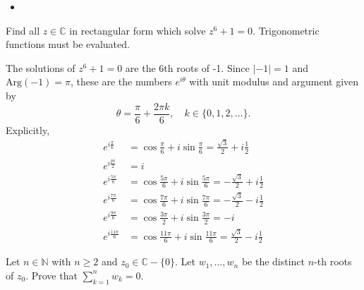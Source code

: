 \documentclass{article}
\newcounter{Problem}
\newenvironment{Problem}{\begin{Exercise}[name={Problem},
                                          counter={Problem}]}
                        {\end{Exercise}}
\begin{document}
\begin{Answer}
  \begin{itemize}
    \item{

    }
  \end{itemize}
\end{Answer}

\begin{Problem}
Find all $z \in \mathbb{C}$ in rectangular form which solve
$z^6 + 1 = 0$. Trigonometric functions must be evaluated.
\end{Problem}

\begin{Answer}
The solutions of $z^6 + 1 = 0$ are the 6th roots of -1. Since $|-1| =
1$ and $\mathrm{Arg}(-1) = \pi$, these are the numbers $e^{i\theta}$ with unit
modulus and argument given by
$$
  \theta
= \frac{\pi}{6} + \frac{2 \pi k}{6},
\quad k \in \{ 0, 1, 2, \dots \}.
$$
Explicitly,
\begin{align*}
   e^{i\frac{\pi}{6}}
&= \cos \frac{\pi}{6} + i \sin \frac{\pi}{6}
 = \frac{\sqrt{3}}{2} + i \frac{1}{2} \\
   e^{i\frac{pi}{2}}
&= i \\
   e^{i\frac{5 \pi}{6}}
&= \cos \frac{5\pi}{6} + i \sin \frac{5\pi}{6}
 = -\frac{\sqrt{3}}{2} + i \frac{1}{2} \\
   e^{i\frac{7\pi}{6}}
&= \cos \frac{7\pi}{6} + i \sin \frac{7\pi}{6}
 = -\frac{\sqrt{3}}{2} - i \frac{1}{2} \\
   e^{i\frac{9\pi}{6}}
&= \cos \frac{3\pi}{2} + i \sin \frac{3\pi}{2}
 = -i \\
   e^{i\frac{11\pi}{6}}
&= \cos \frac{11\pi}{6} + i \sin \frac{11\pi}{6}
 = \frac{\sqrt{3}}{2} - i \frac{1}{2}
\end{align*}

\end{Answer}

\begin{Problem}
Let $n \in \mathbb{N}$ with $n \geq 2$ and
$z_0 \in \mathbb{C} - \{ 0 \}$.
Let $w_1, \dots, w_n$ be the distinct $n$-th roots of $z_0$.
Prove that $\sum_{k=1}^n w_k = 0$.
\end{Problem}
\end{document}
